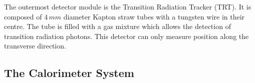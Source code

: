 The outermost detector module is the Transition Radiation Tracker (TRT). It is composed of $4\,mm$ diameter Kapton straw tubes
with a tungsten wire in their centre. The tube is filled with a gas mixture which allows the detection of transition 
radiation photons. This detector can only measure position along the transverse direction.





\subsection{The Calorimeter System}

